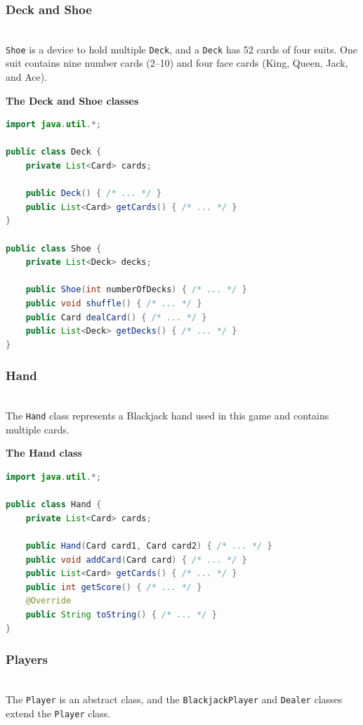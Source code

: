 \subsubsection{Deck and Shoe}\label{d6DcwCJ0jKUAiX5iUpOvw-2}
\\
\texttt{Shoe} is a device to hold multiple \texttt{Deck}, and a \texttt{Deck} has 52 cards of four suits. One suit contains nine number cards (2--10) and four face cards (King, Queen, Jack, and Ace).

\textbf{The Deck and Shoe classes}

\begin{lstlisting}[language=Java]
import java.util.*;

public class Deck {
    private List<Card> cards;

    public Deck() { /* ... */ }
    public List<Card> getCards() { /* ... */ }
}

public class Shoe {
    private List<Deck> decks;

    public Shoe(int numberOfDecks) { /* ... */ }
    public void shuffle() { /* ... */ }
    public Card dealCard() { /* ... */ }
    public List<Deck> getDecks() { /* ... */ }
}
\end{lstlisting}

\subsubsection{Hand}\label{d6DcwCJ0jKUAiX5iUpOvw-3}
\\
The \texttt{Hand} class represents a Blackjack hand used in this game and contains multiple cards.

\textbf{The Hand class}

\begin{lstlisting}[language=Java]
import java.util.*;

public class Hand {
    private List<Card> cards;

    public Hand(Card card1, Card card2) { /* ... */ }
    public void addCard(Card card) { /* ... */ }
    public List<Card> getCards() { /* ... */ }
    public int getScore() { /* ... */ }
    @Override
    public String toString() { /* ... */ }
}
\end{lstlisting}

\subsubsection{Players}\label{YlcfyJSbLgicU6bo0jzVP}
\\
The \texttt{Player} is an abstract class, and the \texttt{BlackjackPlayer} and \texttt{Dealer} classes extend the \texttt{Player} class.


